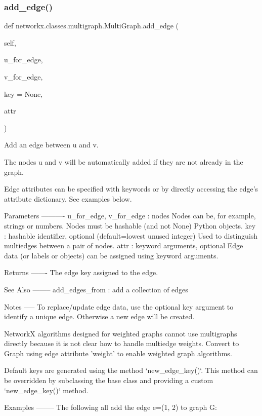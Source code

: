 \subsubsection{\texorpdfstring{add\+\_\+edge()}{add\_edge()}}
{\footnotesize\ttfamily def networkx.\+classes.\+multigraph.\+Multi\+Graph.\+add\+\_\+edge (\begin{DoxyParamCaption}\item[{}]{self,  }\item[{}]{u\+\_\+for\+\_\+edge,  }\item[{}]{v\+\_\+for\+\_\+edge,  }\item[{}]{key = {\ttfamily None},  }\item[{}]{attr }\end{DoxyParamCaption})}

\begin{DoxyVerb}Add an edge between u and v.

The nodes u and v will be automatically added if they are
not already in the graph.

Edge attributes can be specified with keywords or by directly
accessing the edge's attribute dictionary. See examples below.

Parameters
----------
u_for_edge, v_for_edge : nodes
    Nodes can be, for example, strings or numbers.
    Nodes must be hashable (and not None) Python objects.
key : hashable identifier, optional (default=lowest unused integer)
    Used to distinguish multiedges between a pair of nodes.
attr : keyword arguments, optional
    Edge data (or labels or objects) can be assigned using
    keyword arguments.

Returns
-------
The edge key assigned to the edge.

See Also
--------
add_edges_from : add a collection of edges

Notes
-----
To replace/update edge data, use the optional key argument
to identify a unique edge.  Otherwise a new edge will be created.

NetworkX algorithms designed for weighted graphs cannot use
multigraphs directly because it is not clear how to handle
multiedge weights.  Convert to Graph using edge attribute
'weight' to enable weighted graph algorithms.

Default keys are generated using the method `new_edge_key()`.
This method can be overridden by subclassing the base class and
providing a custom `new_edge_key()` method.

Examples
--------
The following all add the edge e=(1, 2) to graph G:


\end{DoxyVerb}

